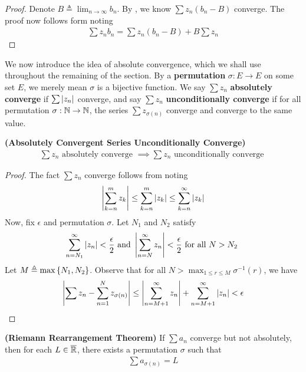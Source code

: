 \documentclass{report}
\begin{document}
\begin{proof}
Denote $B\triangleq \lim_{n\to \infty}b_n$. By , we know $\sum z_n(b_n-B)$ converge. The proof now follows form noting 
\begin{align*}
\sum z_nb_n= \sum z_n(b_n-B)+ B \sum  z_n
\end{align*}
\end{proof}
\begin{mdframed}
We now introduce the idea of absolute convergence, which we shall use throughout the remaining of the section. By a \textbf{permutation} $\sigma:E\rightarrow E$ on some set $E$, we merely mean  $\sigma$ is a bijective function. We say $\sum z_n$ \textbf{absolutely converge} if $\sum \left|z_n\right|$ converge, and say $\sum z_n$ \textbf{unconditionally converge} if for all permutation $\sigma:\mathbb{N}\rightarrow \mathbb{N}$, the series $\sum z_{\sigma (n)}$ converge and converge to the same value.
\end{mdframed}
\begin{theorem}
\label{ACSUC}
\textbf{(Absolutely Convergent Series Unconditionally Converge)} 
\begin{align*}
\sum z_n\text{ absolutely converge }\implies \sum z_n\text{ unconditionally converge }
\end{align*}
\end{theorem}
\begin{proof}
The fact $\sum z_n$ converge  follows from noting 
\begin{align*}
  \left|\sum_{k=n}^mz_k\right|\leq \sum_{k=n}^m \left|z_k\right|\leq \sum_{k=n}^{\infty} \left|z_k\right|
\end{align*}
Now, fix $\epsilon $ and permutation $\sigma$. Let $N_1$ and $N_2$ satisfy 
\begin{align*}   
\sum_{n=N_1}^{\infty}\left|z_n\right|<\frac{\epsilon}{2}\text{ and }\left|\sum_{n=N}^{\infty}z_n\right|<\frac{\epsilon}{2}\text{ for all $N>N_2$ }
\end{align*}
Let $M\triangleq \max \left\{ N_1,N_2 \right\}$. Observe that for all  $N> \max_{1\leq r\leq M} \sigma^{-1}(r)$, we have 
\begin{align*}
\left|\sum z_n - \sum_{n=1}^N z_{\sigma (n)}\right|\leq \left|\sum_{n=M+1}^{\infty} z_n \right|+ \sum_{n=M+1}^{\infty} \left|z_n\right|<\epsilon 
\end{align*}
\end{proof}
\begin{theorem}
\label{RRT}
\textbf{(Riemann Rearrangement Theorem)} If $\sum a_n$ converge but not absolutely, then for each $L\in\overline{\mathbb{R}}$, there exists a permutation $\sigma$ such that 
\begin{align*}
\sum a_{\sigma (n)}=L
\end{align*}
\end{theorem}
\end{document}
